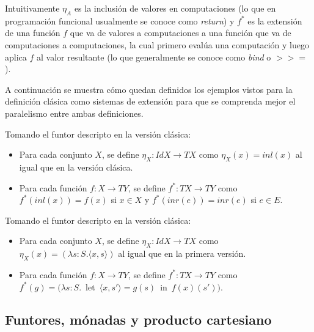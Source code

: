 Intuitivamente $\eta_A$ es la inclusión de valores en computaciones (lo que en programación funcional usualmente se conoce como \textit{return}) y $f^*$ es la extensión de una función $f$ que va de valores a computaciones a una función que va de computaciones a computaciones, la cual primero evalúa una computación y luego aplica $f$ al valor resultante (lo que generalmente se conoce como \textit{bind} o $>$\hspace{-1mm}$>$\hspace{-1mm}$=$).

A continuación se muestra cómo quedan definidos los ejemplos vistos para la definición clásica como sistemas de extensión para que se comprenda mejor el paralelismo entre ambas definiciones. 

\begin{ejemplo} 
Tomando el funtor descripto en la versión clásica:
\begin{itemize}[noitemsep, label=$\blacktriangleright$]
	\item Para cada conjunto $X$, se define $\eta_X : \mathit{Id} X \rightarrow \mathit{T} X$ como $\eta_X (x) = inl(x)$ al igual que en la versión clásica.
	\item Para cada función $f : X \rightarrow \mathit{T}Y$, se define $f^* : \mathit{T} X \rightarrow \mathit{T} Y$ como \mbox{$f^*(inl(x)) = f(x)$} si $x \in X$ y $f^*(inr(e)) = inr(e)$ si $e \in E$.   
\end{itemize}
\end{ejemplo}

\begin{ejemplo} 
Tomando el funtor descripto en la versión clásica:
\begin{itemize}[noitemsep, label=$\blacktriangleright$]
	\item Para cada conjunto $X$, se define $\eta_X : \mathit{Id} X \rightarrow \mathit{T} X$ como $\eta_X (x) = (\lambda s : S . \langle x , s \rangle)$ al igual que en la primera versión.
	\item Para cada función $f : X \rightarrow \mathit{T}Y$, se define $f^* : \mathit{T} X \rightarrow \mathit{T} Y$ como \\ \mbox{$f^*(g) = (\lambda s : S .$ let $\langle x , s' \rangle = g(s)$ in $f(x)(s'))$}.
\end{itemize}
\end{ejemplo}

\subsection{Funtores, mónadas y producto cartesiano}\label{monadas:cartesian}

